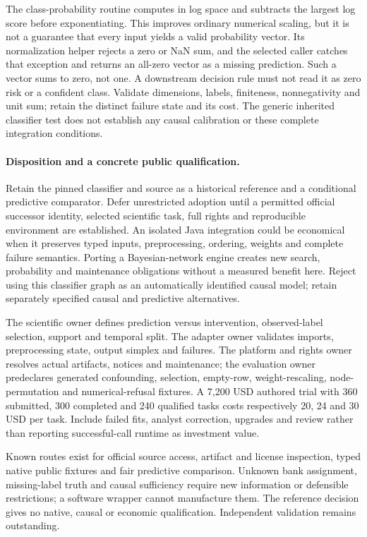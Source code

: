 The class-probability routine computes in log space and subtracts the largest
log score before exponentiating. This improves ordinary numerical scaling,
but it is not a guarantee that every input yields a valid probability vector.
Its normalization helper rejects a zero or NaN sum, and the selected caller
catches that exception and returns an all-zero vector as a missing prediction.
Such a vector sums to zero, not one. A downstream decision rule must not read
it as zero risk or a confident class. Validate dimensions, labels, finiteness,
nonnegativity and unit sum; retain the distinct failure state and its cost.
The generic inherited classifier test does not establish any causal calibration
or these complete integration conditions.\citep{exec24_weka_source,exec24_weka_choice}

\paragraph{Disposition and a concrete public qualification.}
Retain the pinned classifier and source as a historical reference and a
conditional predictive comparator. Defer unrestricted adoption until a
permitted official successor identity, selected scientific task, full rights
and reproducible environment are established. An isolated Java integration
could be economical when it preserves typed inputs, preprocessing, ordering,
weights and complete failure semantics. Porting a Bayesian-network engine
creates new search, probability and maintenance obligations without a measured
benefit here. Reject using this classifier graph as an automatically identified
causal model; retain separately specified causal and predictive alternatives.
\citep{exec24_weka_choice}

The scientific owner defines prediction versus intervention, observed-label
selection, support and temporal split. The adapter owner validates imports,
preprocessing state, output simplex and failures. The platform and rights owner
resolves actual artifacts, notices and maintenance; the evaluation owner
predeclares generated confounding, selection, empty-row, weight-rescaling,
node-permutation and numerical-refusal fixtures. A 7,200 USD authored trial
with 360 submitted, 300 completed and 240 qualified tasks costs respectively
20, 24 and 30 USD per task. Include failed fits, analyst correction, upgrades
and review rather than reporting successful-call runtime as investment value.
\citep{exec24_weka_choice}

Known routes exist for official source access, artifact and license inspection,
typed native public fixtures and fair predictive comparison. Unknown bank
assignment, missing-label truth and causal sufficiency require new information
or defensible restrictions; a software wrapper cannot manufacture them. The
reference decision gives no native, causal or economic qualification.
Independent validation remains outstanding.
